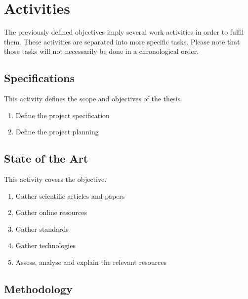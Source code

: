 \chapter{Activities}
\label{chap:activities}

The previously defined objectives imply several work activities in order to fulfil them. These activities are separated into more specific tasks. Please note that those tasks will not necessarily be done in a chronological order.

\section{Specifications}
\label{sec:activities_specifications}

This activity defines the scope and objectives of the thesis.

\begin{enumerate}
	\item Define the project specification
	\item Define the project planning
\end{enumerate}


\section{State of the Art}
\label{sec:activities_sota}

This activity covers the  objective.

\begin{enumerate}
	\item Gather scientific articles and papers
	\item Gather online resources
	\item Gather standards
	\item Gather technologies
	\item Assess, analyse and explain the relevant resources
\end{enumerate}


\section{Methodology}
\label{sec:activities_methodology}

